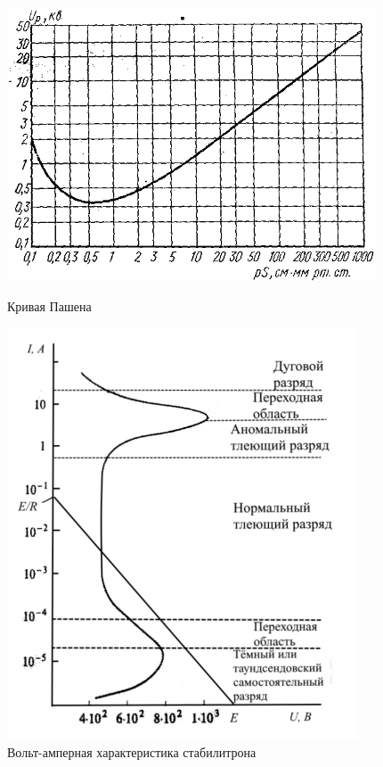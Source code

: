 \documentclass[a4paper]{article}
\begin{document}
\begin{figure}[h]
\begin{center}
\begin{minipage}[h]{0.4\linewidth}
\includegraphics[width=1\linewidth]{pash.PNG}
\caption{Кривая Пашена} %
\label{ris:experimoriginal} %
\end{minipage}
\hfill 
\begin{minipage}[h]{0.35\linewidth}
\includegraphics[width=1\linewidth]{va.PNG}
\caption{Вольт-амперная характеристика стабилитрона}
\label{ris:experimcoded}
\end{minipage}
\end{center}
\end{figure}
\end{document}
